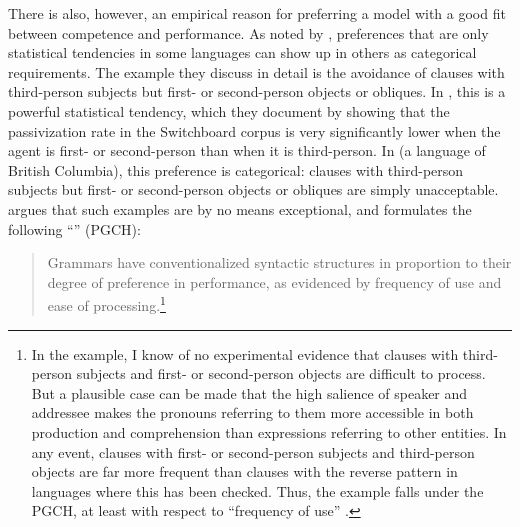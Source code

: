 \documentclass[output=paper
	        ,collection
	        ,collectionchapter
 	        ,biblatex
                ,babelshorthands
                ,newtxmath
                ,draftmode
                ,colorlinks, citecolor=brown
]{langscibook}
\begin{document}
There is also, however, an empirical reason for preferring a model with a good fit between competence and performance.  As noted by \citet{BresnanEtAl2001}, preferences that are only statistical tendencies in some languages can show up in others as categorical requirements.  The example they discuss in detail is the avoidance of clauses with third-person subjects but first- or second-person objects or obliques. In , this is a powerful statistical tendency, which they document by showing that the passivization rate in the Switchboard corpus is very significantly lower when the agent is first- or second-person than when it is third-person.  In  (a  language of British Columbia), this preference is categorical:  clauses with third-person subjects but first- or second-person objects or obliques are simply unacceptable.  \citet{Hawkins2004a-u,Hawkins2014} argues that such examples are by no means exceptional, and formulates the following ``'' (PGCH):
\begin{quote}
Grammars  have  conventionalized  syntactic  structures  in  proportion   to their degree of
preference in performance, as evidenced by frequency of use and ease of processing.\footnote{In the
  \citeauthor{BresnanEtAl2001} example, I know of no experimental evidence that clauses with
  third-person subjects and first- or second-person objects are difficult to process.  But a
  plausible case can be made that the high salience of speaker and addressee makes the pronouns
  referring to them more accessible in both production and comprehension than expressions referring
  to other entities.  In any event, clauses with first- or second-person subjects and third-person
  objects are far more frequent than clauses with the reverse pattern in languages where this has
  been checked.  Thus, the \citeauthor{BresnanEtAl2001} example falls under the PGCH, at least with
  respect to ``frequency of use'' .}
\end{quote}
\end{document}
